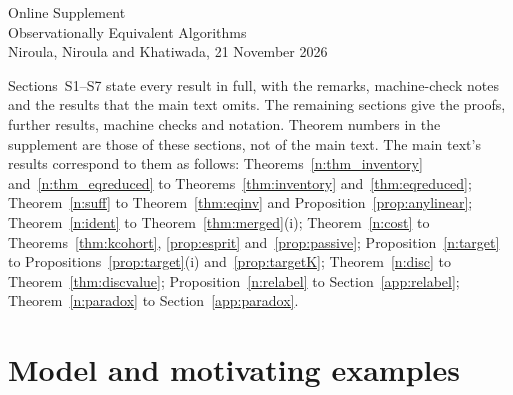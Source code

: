 \documentclass[12pt]{article}
\theoremstyle{definition}
\theoremstyle{remark}
\begin{document}
\appendix
\clearpage
\singlespacing\small\sloppy
\renewcommand{\topfraction}{0.9}\renewcommand{\bottomfraction}{0.8}\renewcommand{\textfraction}{0.07}\renewcommand{\floatpagefraction}{0.75}
\setcounter{page}{1}\setcounter{table}{0}\setcounter{figure}{0}
\begin{center}{\Large Online Supplement}\\[4pt]{\large Observationally Equivalent Algorithms}\\[2pt]{\normalsize Niroula, Niroula and Khatiwada, 21 November 2026}\end{center}

\noindent Sections~S1--S7 state every result in full, with the remarks, machine-check notes and the results that the main text omits. The remaining sections give the proofs, further results, machine checks and notation. Theorem numbers in the supplement are those of these sections, not of the main text. The main text's results correspond to them as follows: Theorems~\ref{n:thm_inventory} and~\ref{n:thm_eqreduced} to Theorems~\ref{thm:inventory} and~\ref{thm:eqreduced}; Theorem~\ref{n:suff} to Theorem~\ref{thm:eqinv} and Proposition~\ref{prop:anylinear}; Theorem~\ref{n:ident} to Theorem~\ref{thm:merged}(i); Theorem~\ref{n:cost} to Theorems~\ref{thm:kcohort}, \ref{prop:esprit} and~\ref{prop:passive}; Proposition~\ref{n:target} to Propositions~\ref{prop:target}(i) and~\ref{prop:targetK}; Theorem~\ref{n:disc} to Theorem~\ref{thm:discvalue}; Proposition~\ref{n:relabel} to Section~\ref{app:relabel}; Theorem~\ref{n:paradox} to Section~\ref{app:paradox}. 

\section{Model and motivating examples}\label{sec:model}
\end{document}
